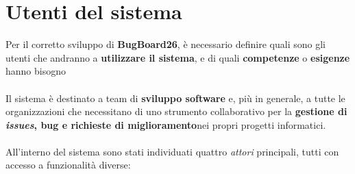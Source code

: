\chapter{Utenti del sistema}

Per il corretto sviluppo di \textbf{BugBoard26}, è necessario definire quali sono gli utenti che andranno a \textbf{utilizzare il sistema}, e di quali \textbf{competenze} o\textbf{ esigenze} hanno bisogno
\\\\
Il sistema è destinato a team di \textbf{sviluppo software} e, più in generale, a tutte le organizzazioni che necessitano di uno strumento collaborativo per la \textbf{gestione di \textit{issues}, bug e richieste di miglioramento}nei propri progetti informatici.
\\\\
All'interno del sistema sono stati individuati quattro \textit{attori} principali, tutti con accesso a funzionalità diverse:
